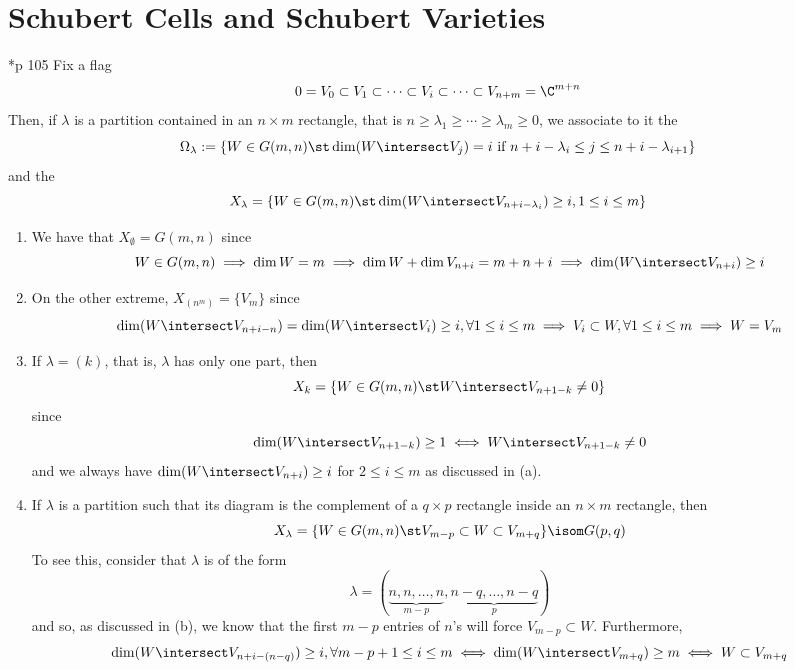 \documentclass[11pt,leqno,oneside]{amsart}
\numberwithin{thm}{section}
\begin{document}
\section{Schubert Cells and Schubert Varieties}
\begin{defn}
  \cite{manivel}*{p 105} Fix a flag \[
    0 = V_0 \subset V_1 \subset \cdots \subset V_i \subset \cdots
    \subset V_{n+m} = \C^{m+n}
  \]
  Then, if \(\lambda\) is a partition contained in an \(n \times m\)
  rectangle, that is \(n \geq \lambda_1 \geq \cdots \geq \lambda_m
  \geq 0\), we associate to it the  \[
    \Omega_\lambda := \{W \in G(m,n) \st \dim(W \intersect V_j) = i
    \text{ if } n+i-\lambda_i \leq j \leq n+i-\lambda_{i+1}\}
  \]
  and the  \[
    X_\lambda = \{W \in G(m,n) \st \dim(W \intersect
    V_{n+i-\lambda_i}) \geq i, 1 \leq i \leq m\}
  \]
\end{defn}
\begin{example}
  \begin{enumerate}
  \item We have that \(X_\emptyset = G(m,n)\) since \[
      W \in G(m,n) \implies \dim W = m \implies \dim W + \dim V_{n+i}
      = m+n+i \implies \dim(W \intersect V_{n+i}) \geq i
    \]
  \item On the other extreme, \(X_{(n^m)} = \{V_m\}\) since \[
      \dim(W \intersect V_{n+i-n}) = \dim(W \intersect V_i) \geq i, \forall 1 \leq i \leq m
      \implies V_i \subset W, \forall 1 \leq i \leq m \implies W = V_m
    \]
  \item If \(\lambda = (k)\), that is, \(\lambda\) has only one part,
    then \[
      X_k = \{W \in G(m,n) \st W \intersect V_{n+1-k} \neq 0\}
    \]
    since \[
      \dim(W \intersect V_{n+1-k}) \geq 1 \iff W \intersect V_{n+1-k} \neq 0
    \]
    and we always have \(\dim(W \intersect V_{n+i}) \geq i\) for \(2
    \leq i \leq m\) 
    as discussed in (a).
  \item If \(\lambda\) is a partition such that its diagram is the
    complement of a \(q \times p\) rectangle inside an \(n \times m\)
    rectangle, then \[
      X_\lambda = \{W \in G(m,n) \st V_{m-p} \subset W \subset
      V_{m+q}\} \isom G(p,q)
    \]
    To see this, consider that \(\lambda\) is of the form \[
      \lambda = (\underbrace{n,n, \ldots, n}_{m-p}, \underbrace{n-q,
        \ldots, n-q}_{p}) 
    \]
    and so, as discussed in (b), we know that the first \(m-p\)
    entries of \(n\)'s will force \(V_{m-p} \subset
    W\). Furthermore, \[
      \dim(W \intersect V_{n+i-(n-q)}) \geq i, \forall m-p+1 \leq i
      \leq m \iff \dim(W \intersect V_{m+q}) \geq m \iff W \subset V_{m+q}
    \]
  \end{enumerate}
\end{example}
\end{document}
